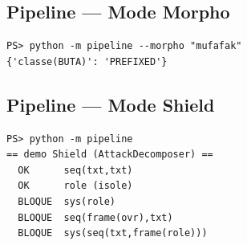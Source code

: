 \documentclass[12pt,a4paper,oneside]{scrartcl}
\begin{document}
\subsection*{Pipeline — Mode Morpho}

\begin{lstlisting}
PS> python -m pipeline --morpho "mufafak"
{'classe(BUTA)': 'PREFIXED'}
\end{lstlisting}

\subsection*{Pipeline — Mode Shield}

\begin{lstlisting}
PS> python -m pipeline
== demo Shield (AttackDecomposer) ==
  OK      seq(txt,txt)
  OK      role (isole)
  BLOQUE  sys(role)
  BLOQUE  seq(frame(ovr),txt)
  BLOQUE  sys(seq(txt,frame(role)))
\end{lstlisting}
\end{document}

